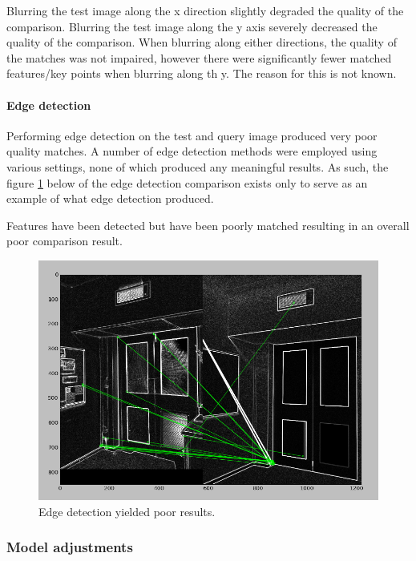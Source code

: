 \documentclass[11pt,a4paper]{report}
\begin{document}
					Blurring the test image along the x direction slightly degraded the quality of the comparison. Blurring the test image along the y axis severely decreased the quality of the comparison.
					When blurring along either directions, the quality of the matches was not impaired, however there were significantly fewer matched features/key points when blurring along th y. The reason for this is not known.
					
				\paragraph{Edge detection}
					Performing edge detection on the test and query image produced very poor quality matches. A number of edge detection methods were employed using various settings, none of which produced any meaningful results.
					As such, the figure \ref{fig:edge_detection_results} below of the edge detection comparison exists only to serve as an example of what edge detection produced.
					
					Features have been detected but have been poorly matched resulting in an overall poor comparison result.
					\begin{figure}[H]
						\centering
						\includegraphics[width=1\textwidth]{edge_detection_results}
						\caption[Edge detection results]{Edge detection yielded poor results.}
						\label{fig:edge_detection_results}
					\end{figure}
					
			\subsubsection{Model adjustments}
\end{document}
